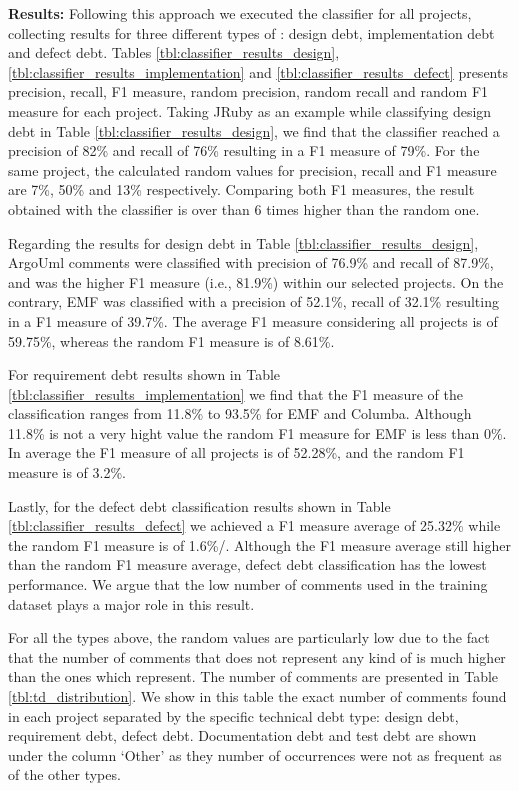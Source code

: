 \vspace{1mm}
\noindent \textbf{Results:} Following this approach we executed the classifier for all projects, collecting results for three different types of \SATD: design debt, implementation debt and defect debt. Tables \ref{tbl:classifier_results_design}, \ref{tbl:classifier_results_implementation} and \ref{tbl:classifier_results_defect} presents precision, recall, F1 measure, random precision, random recall and random F1 measure for each project. Taking JRuby as an example while classifying design debt in Table \ref{tbl:classifier_results_design}, we find that the classifier reached a precision of 82\% and recall of 76\% resulting in a F1 measure of 79\%. For the same project, the calculated random values for precision, recall and F1 measure are 7\%, 50\% and 13\% respectively. Comparing both F1 measures, the result obtained with the classifier is over than 6 times higher than the random one.

Regarding the results for design debt in Table \ref{tbl:classifier_results_design}, ArgoUml \SATD comments were classified with precision of 76.9\% and recall of 87.9\%, and was the higher F1 measure (i.e., 81.9\%) within our selected projects. On the contrary, EMF was classified with a precision of 52.1\%, recall of 32.1\% resulting in a F1 measure of 39.7\%. The average F1 measure considering  all projects is of 59.75\%, whereas the random F1 measure is of 8.61\%. 

For requirement debt results shown in Table \ref{tbl:classifier_results_implementation} we find that the F1 measure of the classification ranges from 11.8\% to 93.5\% for EMF and Columba. Although 11.8\% is not a very hight value the random F1 measure for EMF is less than 0\%. In average the F1 measure of all projects is of 52.28\%, and the random F1 measure is of 3.2\%. 

Lastly, for the defect debt classification results shown in Table \ref{tbl:classifier_results_defect} we achieved a F1 measure average of 25.32\% while the random F1 measure is of 1.6\%/. 
Although the F1 measure average still higher than the random F1 measure average, defect debt classification has the lowest performance. We argue that the low number of \SATD comments used in the training dataset plays a major role in this result. 

For all the types above, the random values are particularly low due to the fact that the number of comments that does not represent any kind of \SATD is much higher than the ones which represent. The number of \SATD comments are presented in Table \ref{tbl:td_distribution}. We show in this table the exact number of \SATD comments found in each project separated by the specific technical debt type: design debt, requirement debt, defect debt. Documentation debt and test debt are shown under the column `Other' as they number of occurrences were not as frequent as of the other types. 

